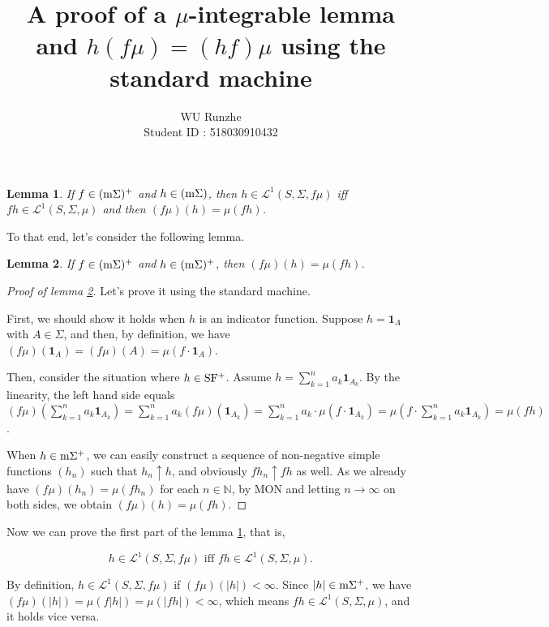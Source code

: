 \documentclass[12pt]{article}
\title{A proof of a $\mu$-integrable lemma and $h(f\mu)=(hf)\mu$ using the standard machine}
\author{WU Runzhe\\
	Student ID : 518030910432}
\date{}
\newcommand\bN{\mathbb{N}}
\newcommand{\ind}[1]{\mathbf{1}_{#1}}
\newcommand{\ms}{\rm{m}\Sigma}
\newtheorem{lemma}{Lemma}
\begin{document}
	\maketitle \large
	
	\begin{tcolorbox}
		\begin{lemma}\label{ll}
			If $f\in (\ms)^+$ and $h\in (\ms)$, then $h\in \mathcal{L}^1(S,\Sigma,f\mu)$ iff $fh\in \mathcal{L}^1(S,\Sigma,\mu)$ and then $(f\mu)(h)=\mu(fh)$.
		\end{lemma}
	\end{tcolorbox}

	To that end, let's consider the following lemma.
	
	\begin{lemma}\label{l1}
		If $f\in (\ms)^+$ and $h\in (\ms)^+$, then $(f\mu)(h)=\mu(fh)$.
	\end{lemma}

	\begin{proof}[Proof of lemma \ref{l1}]
		
		Let's prove it using the standard machine.
		
		First, we should show it holds when $h$ is an indicator function. Suppose $h=\ind{A}$ with $A\in\Sigma$, and then, by definition, we have $(f\mu)(\ind{A})=(f\mu)(A)=\mu(f\cdot \ind{A})$.
		
		Then, consider the situation where $h\in \rm{SF^+}$. Assume $h=\sum_{k=1}^na_k\ind{A_k}$. By the linearity, the left hand side equals $(f\mu)(\sum_{k=1}^na_k\ind{A_k})=\sum_{k=1}^n a_k(f\mu)(\ind{A_k})=\sum_{k=1}^n a_k\cdot\mu(f\cdot \ind{A_k})=\mu(f\cdot \sum_{k=1}^n a_k\ind{A_k})=\mu(fh)$.
		
		When $h\in \ms^+$, we can easily construct a sequence of non-negative simple functions $(h_n)$ such that $h_n\uparrow h$, and obviously $fh_n\uparrow fh$ as well. As we already have $(f\mu)(h_n)=\mu(fh_n)$ for each $n\in\bN$, by MON and letting $n\rightarrow \infty$ on both sides, we obtain $(f\mu)(h)=\mu(fh)$.
		
	\end{proof}

	Now we can prove the first part of the lemma \ref{ll}, that is,
	
	$$h\in \mathcal{L}^1(S,\Sigma,f\mu) \text{ iff } fh\in \mathcal{L}^1(S,\Sigma,\mu).$$
	
	By definition, $h\in \mathcal{L}^1(S,\Sigma,f\mu)$ if $(f\mu)(|h|)<\infty$. Since $|h|\in \ms^+$, we have $(f\mu)(|h|)=\mu(f|h|)=\mu(|fh|)<\infty$, which means $fh\in \mathcal{L}^1(S,\Sigma,\mu)$, and it holds vice versa.
	
\end{document}
